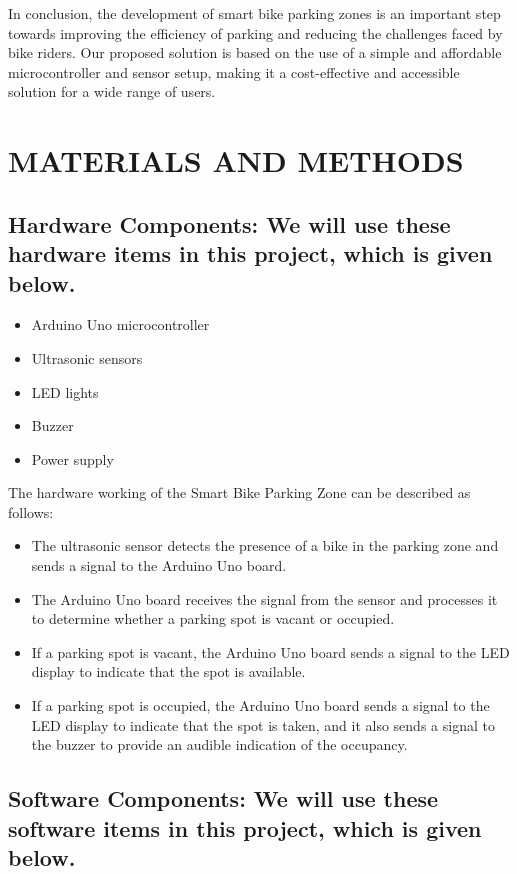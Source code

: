 \documentclass[conference]{IEEEtran}
\begin{document}
	In conclusion, the development of smart bike parking zones is an important step towards improving the efficiency of parking and reducing the challenges faced by bike riders. Our proposed solution is based on the use of a simple and affordable microcontroller and sensor setup, making it a cost-effective and accessible solution for a wide range of users.
	
	\section{MATERIALS AND METHODS}
	

	\subsection{Hardware Components: We will use these hardware items in this project, which is given below.}

	\begin{itemize}
	\item Arduino Uno microcontroller
	\item Ultrasonic sensors
	\item LED lights
	\item Buzzer
	\item Power supply
	\end{itemize}
The hardware working of the Smart Bike Parking Zone can be described as follows:
	\begin{itemize}
	\item The ultrasonic sensor detects the presence of a bike in the parking zone and sends a signal to the Arduino Uno board.
	\item The Arduino Uno board receives the signal from the sensor and processes it to determine whether a parking spot is vacant or occupied.
	\item If a parking spot is vacant, the Arduino Uno board sends a signal to the LED display to indicate that the spot is available.
	\item If a parking spot is occupied, the Arduino Uno board sends a signal to the LED display to indicate that the spot is taken, and it also sends a signal to the buzzer to provide an audible indication of the occupancy.
\end{itemize}


	\subsection{Software Components: We will use these software items in this project, which is given below.}
	
\end{document}
